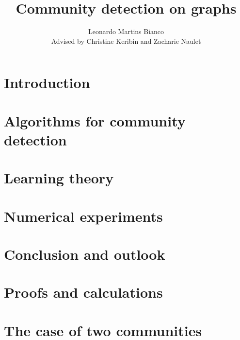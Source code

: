 \documentclass[11pt]{report}
\title{Community detection on graphs}
\author{Leonardo Martins Bianco\\[0.5cm]{\small Advised by Christine Keribin 
and Zacharie Naulet}}
\date{ }  %
\begin{document}
\maketitle
\setcounter{tocdepth}{1}
\tableofcontents

\chapter{Introduction}


\chapter{Algorithms for community detection}




\chapter{Learning theory}





\chapter{Numerical experiments}


\chapter{Conclusion and outlook}


\appendix

\chapter{Proofs and calculations}



\chapter{The case of two communities}

\end{document}
